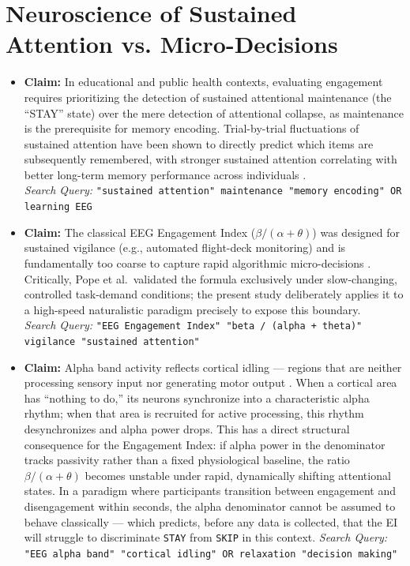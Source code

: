 \documentclass[12pt,a4paper]{report}
\begin{document}
\section{Neuroscience of Sustained Attention vs. Micro-Decisions}
\begin{itemize}
    \item \textbf{Claim:} In educational and public health contexts, evaluating engagement requires prioritizing the detection of sustained attentional maintenance (the ``STAY'' state) over the mere detection of attentional collapse, as maintenance is the prerequisite for memory encoding. Trial-by-trial fluctuations of sustained attention have been shown to directly predict which items are subsequently remembered, with stronger sustained attention correlating with better long-term memory performance across individuals \cite{debettencourt_sustained_2021}.\\
    \textit{Search Query:} \texttt{"sustained attention" maintenance "memory encoding" OR learning EEG}
    
    \item \textbf{Claim:} The classical EEG Engagement Index ($\beta / (\alpha + \theta)$) was designed for sustained vigilance (e.g., automated flight-deck monitoring) and is fundamentally too coarse to capture rapid algorithmic micro-decisions \cite{pope_biocybernetic_1995-3}. Critically, Pope et al.\ validated the formula exclusively under slow-changing, controlled task-demand conditions; the present study deliberately applies it to a high-speed naturalistic paradigm precisely to expose this boundary.\\
    \textit{Search Query:} \texttt{"EEG Engagement Index" "beta / (alpha + theta)" vigilance "sustained attention"}

    \item \textbf{Claim:} Alpha band activity reflects cortical idling --- regions that are neither processing sensory input nor generating motor output \cite{pfurtscheller_event-related_1996}. When a cortical area has ``nothing to do,'' its neurons synchronize into a characteristic alpha rhythm; when that area is recruited for active processing, this rhythm desynchronizes and alpha power drops. This has a direct structural consequence for the Engagement Index: if alpha power in the denominator tracks passivity rather than a fixed physiological baseline, the ratio $\beta / (\alpha + \theta)$ becomes unstable under rapid, dynamically shifting attentional states. In a paradigm where participants transition between engagement and disengagement within seconds, the alpha denominator cannot be assumed to behave classically --- which predicts, before any data is collected, that the EI will struggle to discriminate \texttt{STAY} from \texttt{SKIP} in this context.
    \textit{Search Query:} \texttt{"EEG alpha band" "cortical idling" OR relaxation "decision making"}
    

\end{itemize}
\end{document}
